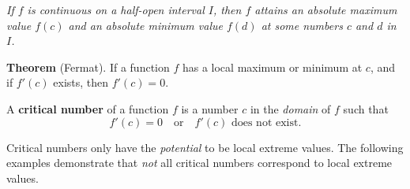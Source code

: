 \documentclass[../main.tex]{subfiles}
\begin{document}
\begin{enumerate}
    \begin{minipage}{.4\textwidth}
    \end{minipage}
    \begin{minipage}{.55\textwidth}
      \vspace{-2cm}
      \textit{If \(f\) is continuous on a half-open interval \(I\), then \(f\) attains an absolute maximum value \(f(c)\) \emph{and} an absolute minimum value \(f(d)\) at some numbers \(c\) and \(d\) in \(I\).}
    \end{minipage}
\end{enumerate}
\clearpage

\begin{mdframed}[style=withref]
  \textbf{Theorem} (Fermat). If a function \(f\) has a local maximum or minimum at \(c\), and if \(f'(c)\) exists, then \(f'(c) = 0\).

\end{mdframed}
\bigskip

\begin{mdframed}[style=withref]
  A \textbf{critical number} of a function \(f\) is a number \(c\) in the \emph{domain} of \(f\) such that 
  \[
    f'(c) = 0 \quad\text{or}\quad f'(c) \text{ does not exist}.
  \]

\end{mdframed}
\faExclamationTriangle{} Critical numbers only have the \emph{potential} to be local extreme values. The following examples demonstrate that \emph{not} all critical numbers correspond to local extreme values. 


\begin{center}
\hspace{1in}
\end{center}
\medskip
\end{document}
